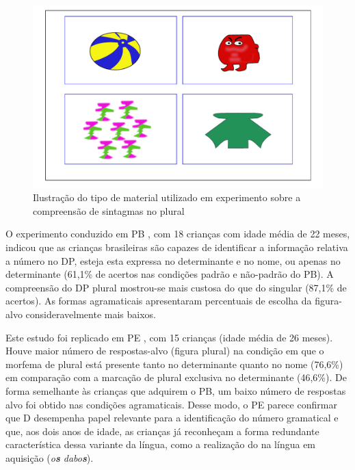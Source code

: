 \documentclass[output=paper]{LSP/langsci}
\begin{document}
\begin{figure}
\includegraphics[width=\textwidth]{figures/correanp3.pdf}
\caption{Ilustração do tipo de material utilizado em experimento sobre a compreensão de sintagmas no plural}
\label{fig:correanp_3}
\end{figure}

O experimento conduzido em PB \citep{correa_etal2005}, com 18 crianças com idade média de 22 meses, indicou que as crianças brasileiras são capazes de identificar a informação relativa a número no DP, esteja esta expressa no determinante e no nome, ou apenas no determinante (61,1\% de acertos nas condições padrão e não-padrão do PB). A compreensão do DP plural mostrou-se mais custosa do que do singular (87,1\% de acertos). As formas agramaticais apresentaram percentuais de escolha da figura-alvo consideravelmente mais baixos. 

Este estudo foi replicado em PE \citep{castroferrarineto2007}, com 15 crianças (idade média de 26 meses).  Houve maior número de respostas-alvo (figura plural) na condição em que o morfema de plural está presente tanto no determinante quanto no nome (76,6\%) em comparação com a marcação de plural exclusiva no determinante (46,6\%).  De forma semelhante às crianças que adquirem o PB, um baixo número de respostas alvo foi obtido nas condições agramaticais.  Desse modo, o PE parece confirmar que D desempenha papel relevante para a identificação do número gramatical e que, aos dois anos de idade, as crianças já reconheçam a forma redundante característica dessa variante da língua, como a realização do  na língua em aquisição (\textit{o\textbf{s} dabo\textbf{s}}).
\end{document}

